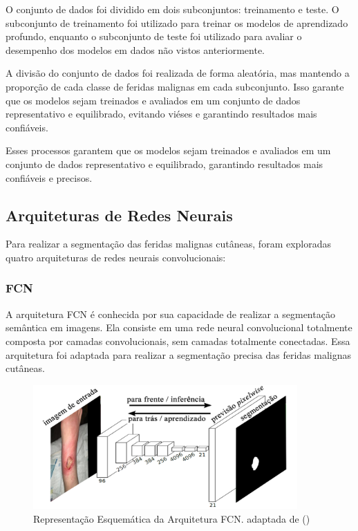     O conjunto de dados foi dividido em dois subconjuntos: treinamento e teste. O subconjunto de treinamento foi utilizado para treinar os modelos de aprendizado profundo, enquanto o subconjunto de teste foi utilizado para avaliar o desempenho dos modelos em dados não vistos anteriormente.

    A divisão do conjunto de dados foi realizada de forma aleatória, mas mantendo a proporção de cada classe de feridas malignas em cada subconjunto. Isso garante que os modelos sejam treinados e avaliados em um conjunto de dados representativo e equilibrado, evitando viéses e garantindo resultados mais confiáveis.

    Esses processos garantem que os modelos sejam treinados e avaliados em um conjunto de dados representativo e equilibrado, garantindo resultados mais confiáveis e precisos.

\subsection{Arquiteturas de Redes Neurais}
    Para realizar a segmentação das feridas malignas cutâneas, foram exploradas quatro arquiteturas de redes neurais convolucionais:

    \subsubsection{FCN}

        A arquitetura \ac{FCN} é conhecida por sua capacidade de realizar a segmentação semântica em imagens. Ela consiste em uma rede neural convolucional totalmente composta por camadas convolucionais, sem camadas totalmente conectadas. Essa arquitetura foi adaptada para realizar a segmentação precisa das feridas malignas cutâneas.

        \begin{figure}[H]
            \centering
            \includegraphics[width=0.9\textwidth]{img/arquitetura_FCN.png}
            \caption{Representação Esquemática da Arquitetura \ac{FCN}. adaptada de (\cite{long2015fully})}
            \label{fig:arquiteturaFCN}
        \end{figure}

